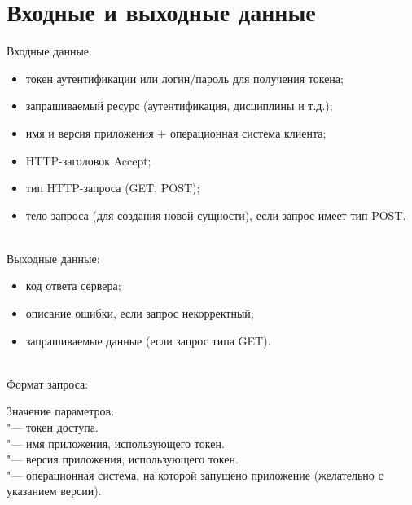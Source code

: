 \chapter{Входные и выходные данные}
\label{ch:io}

Входные данные:
\begin{itemize}
  \item токен аутентификации или логин/пароль для получения токена;
  \item запрашиваемый ресурс (аутентификация, дисциплины и т.д.);
  \item имя и версия приложения + операционная система клиента;
  \item HTTP-заголовок Accept;
  \item тип HTTP-запроса (GET, POST);
  \item тело запроса (для создания новой сущности), если запрос имеет тип POST\@.
\end{itemize}

~\\
Выходные данные:
\begin{itemize}
  \item код ответа сервера;
  \item описание ошибки, если запрос некорректный;
  \item запрашиваемые данные (если запрос типа GET).
\end{itemize}

~\\
Формат запроса:
\begin{listing}[H]
\end{listing}
\vspace{-0.75cm}

Значение параметров:\\
 "--- токен доступа.\\
 "--- имя приложения, использующего токен.\\
 "--- версия приложения, использующего токен.\\
 "--- операционная система, на которой запущено приложение (желательно с указанием версии).
